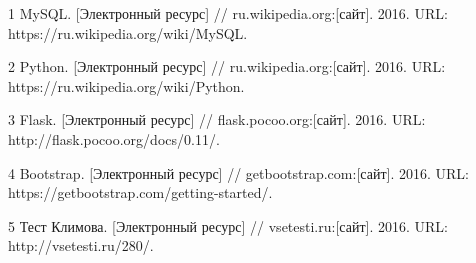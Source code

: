 1 MySQL. [Электронный ресурс] // ru.wikipedia.org:[сайт]. 2016. URL: https://ru.wikipedia.org/wiki/MySQL.

2 Python. [Электронный ресурс] // ru.wikipedia.org:[сайт]. 2016. URL: https://ru.wikipedia.org/wiki/Python.

3 Flask. [Электронный ресурс] // flask.pocoo.org:[сайт]. 2016. URL: http://flask.pocoo.org/docs/0.11/.

4 Bootstrap. [Электронный ресурс] // getbootstrap.com:[сайт]. 2016. URL: https://getbootstrap.com/getting-started/.

5 Тест Климова. [Электронный ресурс] // vsetesti.ru:[сайт]. 2016. URL: http://vsetesti.ru/280/.